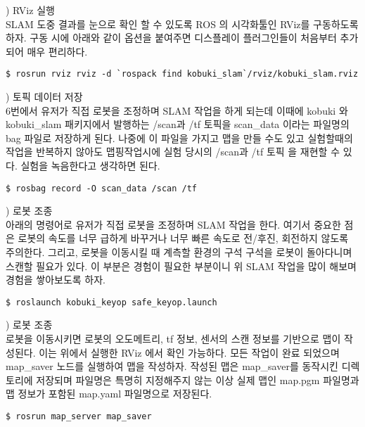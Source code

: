 \vspace{\baselineskip}
\noindent
{}
\thenum) RViz 실행\\
SLAM 도중 결과를 눈으로 확인 할 수 있도록 ROS 의 시각화툴인 RViz를 구동하도록 하자. 구동 시에 아래와 같이 옵션을 붙여주면 디스플레이 플러그인들이 처음부터 추가되어 매우 편리하다.
\vspace{\baselineskip}
\begin{lstlisting}[language=ROS]
$ rosrun rviz rviz -d `rospack find kobuki_slam`/rviz/kobuki_slam.rviz
\end{lstlisting}


\vspace{\baselineskip}
\noindent
{}
\thenum) 토픽 데이터 저장\\
6번에서 유저가 직접 로봇을 조정하며 SLAM 작업을 하게 되는데 이때에 kobuki 와 kobuki\_slam 패키지에서 발행하는 /scan과 /tf 토픽을 scan\_data 이라는 파일명의 bag 파일로 저장하게 된다. 나중에 이 파일을 가지고 맵을 만들 수도 있고 실험할때의 작업을 반복하지 않아도 맵핑작업시에 실험 당시의 /scan과 /tf 토픽 을 재현할 수 있다. 실험을 녹음한다고 생각하면 된다.

\vspace{\baselineskip}
\begin{lstlisting}[language=ROS]
$ rosbag record -O scan_data /scan /tf
\end{lstlisting}

\vspace{\baselineskip}
\noindent
{}
\thenum) 로봇 조종\\
아래의 명령어로 유저가 직접 로봇을 조정하며 SLAM 작업을 한다. 여기서 중요한 점은 로봇의 속도를 너무 급하게 바꾸거나 너무 빠른 속도로 전/후진, 회전하지 않도록 주의한다. 그리고, 로봇을 이동시킬 때 계측할 환경의 구석 구석을 로봇이 돌아다니며 스캔할 필요가 있다. 이 부분은 경험이 필요한 부분이니 위 SLAM 작업을 많이 해보며 경험을 쌓아보도록 하자. 
\vspace{\baselineskip}
\begin{lstlisting}[language=ROS]
$ roslaunch kobuki_keyop safe_keyop.launch
\end{lstlisting}

\vspace{\baselineskip}
\noindent
{}
\thenum) 로봇 조종\\
로봇을 이동시키면 로봇의 오도메트리, tf 정보, 센서의 스캔 정보를 기반으로 맵이 작성된다. 이는 위에서 실행한 RViz 에서 확인 가능하다. 모든 작업이 완료 되었으며 map\_saver 노드를 실행하여 맵을 작성하자. 작성된 맵은 map\_saver를 동작시킨 디렉토리에 저장되며 파일명은 특명히 지정해주지 않는 이상 실제 맵인 map.pgm 파일명과 맵 정보가 포함된 map.yaml 파일명으로 저장된다.
\vspace{\baselineskip}
\begin{lstlisting}[language=ROS]
$ rosrun map_server map_saver
\end{lstlisting}

